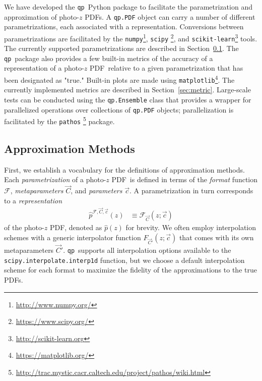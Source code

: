 \documentclass[\docopts]{\docclass}
\newcommand{\qp}{\texttt{qp}}
\newcommand{\pz}{photo-$z$ PDF}
\begin{document}
We have developed the \qp\ Python package to facilitate the parametrization and 
approximation of \pz s.
A \texttt{qp.PDF} object can carry a number of different parametrizations, each 
associated with a representation.
Conversions between parametrizations are facilitated by the 
\texttt{numpy}\footnote{\url{http://www.numpy.org/}}, \texttt{scipy} 
\footnote{\url{https://www.scipy.org/}}, and 
\texttt{scikit-learn}\footnote{\url{http://scikit-learn.org}} 
\citep{pedregosa_scikit-learn:_2011} tools.
The currently supported parametrizations are described in 
Section~\ref{sec:approx}.
The \qp\ package also provides a few built-in metrics of the accuracy of a 
representation of a \pz\ relative to a given parametrization that has been 
designated as "true."
Built-in plots are made using 
\texttt{matplotlib}\footnote{\url{https://matplotlib.org/}}.
The currently implemented metrics are described in Section~\ref{sec:metric}.
Large-scale tests can be conducted using the \texttt{qp.Ensemble} class that 
provides a wrapper for parallelized operations over collections of 
\texttt{qp.PDF} objects; parallelization is facilitated by the \texttt{pathos} 
\footnote{\url{http://trac.mystic.cacr.caltech.edu/project/pathos/wiki.html}} 
\citep{mckerns_building_2012, mckerns_pathos:_2010} package.

\subsection{Approximation Methods}
\label{sec:approx}

First, we establish a vocabulary for the definitions of approximation methods.
Each \textit{parametrization} of a \pz\ is defined in terms of the 
\textit{format} function $\mathcal{F}$, \textit{metaparameters} $\vec{C}$, and 
\textit{parameters} $\vec{c}$.
A parametrization in turn corresponds to a \textit{representation}
\begin{align}
  \label{eq:definition}
  \hat{p}^{\mathcal{F}, \vec{C}, \vec{c}}(z) &\equiv \mathcal{F}_{\vec{C}}(z; 
\vec{c})
\end{align}
of the \pz, denoted as $\hat{p}(z)$ for brevity.
We often employ interpolation schemes with a generic interpolator function 
$F_{\vec{C}'}(z; \vec{c})$ that comes with its own metaparameters $\vec{C}'$.
\qp\ supports all interpolation options available to the 
\texttt{scipy.interpolate.interp1d} function, but we choose a default 
interpolation scheme for each format to maximize the fidelity of the 
approximations to the true PDFs.
\end{document}
